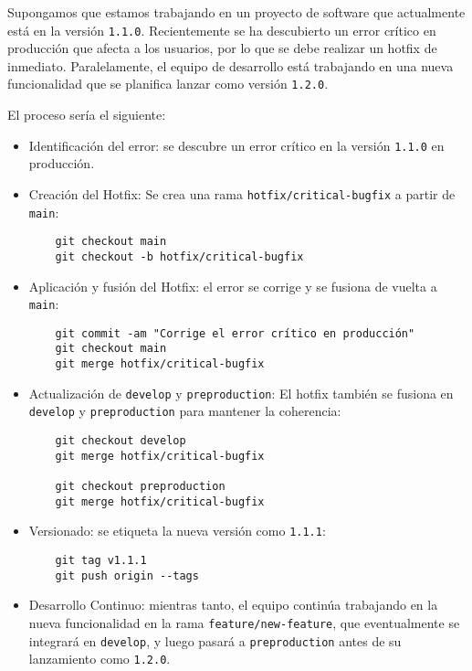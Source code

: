 \documentclass{template/uem_theme}
\begin{document}
Supongamos que estamos trabajando en un proyecto de software que actualmente está en la versión \texttt{1.1.0}. Recientemente se ha descubierto un error crítico en producción que afecta a los usuarios, por lo que se debe realizar un hotfix de inmediato. Paralelamente, el equipo de desarrollo está trabajando en una nueva funcionalidad que se planifica lanzar como versión \texttt{1.2.0}.

El proceso sería el siguiente:

\begin{itemize}
    \item Identificación del error: se descubre un error crítico en la versión \texttt{1.1.0} en producción.
    \item Creación del Hotfix: Se crea una rama \texttt{hotfix/critical-bugfix} a partir de \texttt{main}:
    \begin{verbatim}
    git checkout main
    git checkout -b hotfix/critical-bugfix
    \end{verbatim}
    \item Aplicación y fusión del Hotfix: el error se corrige y se fusiona de vuelta a \texttt{main}:
    \begin{verbatim}
    git commit -am "Corrige el error crítico en producción"
    git checkout main
    git merge hotfix/critical-bugfix
    \end{verbatim}
    \item Actualización de \texttt{develop} y \texttt{preproduction}: El hotfix también se fusiona en \texttt{develop} y \texttt{preproduction} para mantener la coherencia:
    \begin{verbatim}
    git checkout develop
    git merge hotfix/critical-bugfix
    
    git checkout preproduction
    git merge hotfix/critical-bugfix
    \end{verbatim}
    \item Versionado: se etiqueta la nueva versión como \texttt{1.1.1}:
    \begin{verbatim}
    git tag v1.1.1
    git push origin --tags
    \end{verbatim}
    \item Desarrollo Continuo: mientras tanto, el equipo continúa trabajando en la nueva funcionalidad en la rama \texttt{feature/new-feature}, que eventualmente se integrará en \texttt{develop}, y luego pasará a \texttt{preproduction} antes de su lanzamiento como \texttt{1.2.0}.
\end{itemize}
\end{document}
